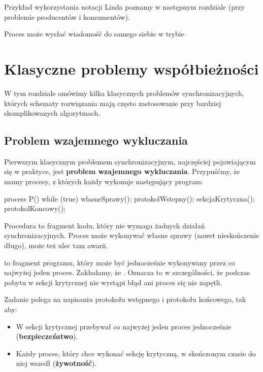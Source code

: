 Przykład wykorzystania notacji Linda poznamy w następnym rozdziale (przy problemie producentów i konsumentów).

\begin{problems}
    \prob Proces może wysłać wiadomość do samego siebie w trybie
\end{problems}

\section{Klasyczne problemy współbieżności}

W tym rozdziale omówimy kilka klasycznych problemów synchronizacyjnych, których schematy rozwiązania mają często zastosowanie przy bardziej skomplikowanych algorytmach.

\subsection{Problem wzajemnego wykluczania}

Pierwszym klasycznym problemem synchronizacyjnym, najczęściej pojawiającym się w praktyce, jest \textbf{problem wzajemnego wykluczania}. Przypuśćmy, że mamy procesy, z których każdy wykonuje następujący program:
\begin{java}
    process P() {
        while (true) {
            wlasneSprawy();
            protokolWstepny();
            sekcjaKrytyczna();
            protokolKoncowy();
        }
    }
\end{java}

Procedura  to fragment kodu, który nie wymaga żadnych działań synchronizacyjnych. Proces może wykonywać własne sprawy  (nawet nieskończenie długo), może też ulec tam awarii.

 to fragment programu, który może być jednocześnie wykonywany przez co najwyżej jeden proces. Zakładamy, że . Oznacza to w szczególności, że podczas pobytu w sekcji krytycznej nie wystąpi błąd ani proces się nie zapętli.

Zadanie polega na napisaniu protokołu wstępnego i protokołu końcowego, tak aby:
\begin{itemize}
    \item W sekcji krytycznej przebywał co najwyżej jeden proces jednocześnie (\textbf{bezpieczeństwo}).
    \item Każdy proces, który chce wykonać sekcję krytyczną, w skończonym czasie do niej wszedł (\textbf{żywotność}).
\end{itemize}

